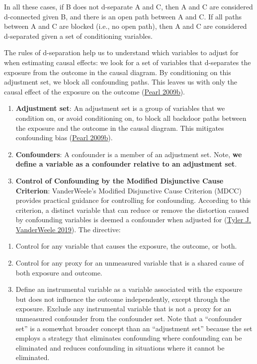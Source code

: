 \documentclass[
  singlecolumn]{report}
\providecommand{\tightlist}{%
  \setlength{\itemsep}{0pt}\setlength{\parskip}{0pt}}\usepackage{longtable,booktabs,array}
\begin{document}
In all these cases, if B does not d-separate A and C, then A and C are
considered d-connected given B, and there is an open path between A and
C. If all paths between A and C are blocked (i.e., no open path), then A
and C are considered d-separated given a set of conditioning variables.

The rules of d-separation help us to understand which variables to
adjust for when estimating causal effects: we look for a set of
variables that d-separates the exposure from the outcome in the causal
diagram. By conditioning on this adjustment set, we block all
confounding paths. This leaves us with only the causal effect of the
exposure on the outcome (\protect\hyperlink{ref-pearl2009a}{Pearl
2009b}).

\begin{enumerate}
\def\labelenumi{\arabic{enumi}.}
\setcounter{enumi}{4}
\item
  \textbf{Adjustment set}: An adjustment set is a group of variables
  that we condition on, or avoid conditioning on, to block all backdoor
  paths between the exposure and the outcome in the causal diagram. This
  mitigates confounding bias (\protect\hyperlink{ref-pearl2009a}{Pearl
  2009b}).
\item
  \textbf{Confounders}: A confounder is a member of an adjustment set.
  Note, \textbf{we define a variable as a confounder relative to an
  adjustment set}.
\item
  \textbf{Control of Confounding by the Modified Disjunctive Cause
  Criterion}: VanderWeele's Modified Disjunctive Cause Criterion (MDCC)
  provides practical guidance for controlling for confounding. According
  to this criterion, a distinct variable that can reduce or remove the
  distortion caused by confounding variables is deemed a confounder when
  adjusted for (\protect\hyperlink{ref-vanderweele2019}{Tyler J.
  VanderWeele 2019}). The directive:
\end{enumerate}

\begin{enumerate}
\def\labelenumi{\alph{enumi}.}
\tightlist
\item
  Control for any variable that causes the exposure, the outcome, or
  both.
\item
  Control for any proxy for an unmeasured variable that is a shared
  cause of both exposure and outcome.
\item
  Define an instrumental variable as a variable associated with the
  exposure but does not influence the outcome independently, except
  through the exposure. Exclude any instrumental variable that is not a
  proxy for an unmeasured confounder from the confounder set. Note that
  a ``confounder set'' is a somewhat broader concept than an
  ``adjustment set'' because the set employs a strategy that eliminates
  confounding where confounding can be eliminated and reduces
  confounding in situations where it cannot be eliminated.
\end{enumerate}
\end{document}
